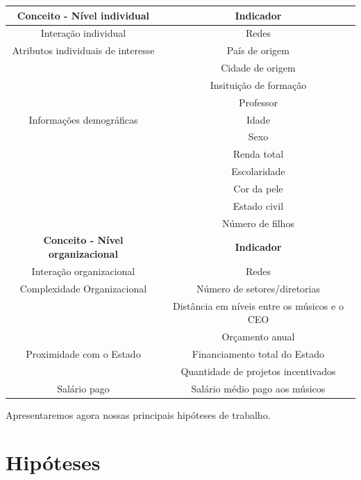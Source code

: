 \documentclass[a4paper, 12pt, openright, oneside, german, french, english, brazil]{abntex2}
\begin{document}
	
	\begin{table}[!ht]
		{\begin{tabular}{|c|c|}
				
				\hline
				\textbf{Conceito - Nível individual} & \textbf{Indicador} \\
				\hline
				Interação individual & Redes \\
				\hline
				Atributos individuais de interesse & País de origem  \\
				& Cidade de origem  \\
				& Insituição de formação \\
				& Professor    \\
				\hline
				Informações demográficas & Idade \\
				& Sexo \\
				& Renda total \\
				& Escolaridade \\
				& Cor da pele \\
				& Estado civil \\
				& Número de filhos \\
				\hline
				\textbf{Conceito - Nível organizacional} & \textbf{Indicador} \\
				\hline
				Interação organizacional & Redes \\
				\hline
				
				Complexidade Organizacional  & Número de setores/diretorias  \\
				& Distância em níveis entre os músicos e o CEO \\
				& Orçamento anual \\
				\hline
				Proximidade com o Estado & Financiamento total do Estado \\
				& Quantidade de projetos incentivados \\
				\hline
				Salário pago & Salário médio pago aos músicos \\
				\hline
				
			\end{tabular}
		}
		{}
	\end{table}
	


	Apresentaremos agora nossas principais hipóteses de trabalho.
	
	\section{Hipóteses}\label{hipoteses}
	
\end{document}
